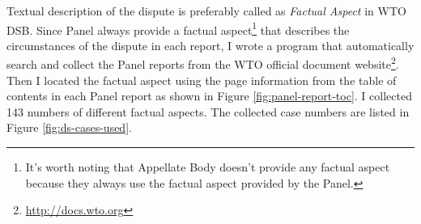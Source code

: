 Textual description of the dispute is preferably called as
\textit{Factual Aspect} in WTO DSB.
Since Panel
always provide a factual aspect\footnote{
  It's worth noting that Appellate Body doesn't provide any factual aspect because they always use the factual aspect provided by the Panel.
}
that describes the circumstances of the dispute
in each report, %
I wrote a program that
automatically search and collect
the Panel reports from the WTO official document website\footnote{
  \url{http://docs.wto.org}
}.
Then I located the factual aspect using the page information from the
table of contents in each Panel report as shown in Figure \ref{fig:panel-report-toc}.
I collected 143 numbers of different factual aspects. The collected case numbers are listed in Figure \ref{fig:ds-cases-used}.

